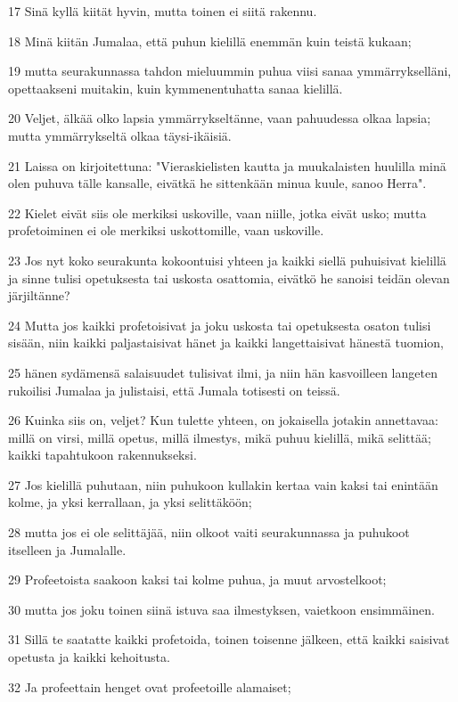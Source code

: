 \par 17 Sinä kyllä kiität hyvin, mutta toinen ei siitä rakennu.
\par 18 Minä kiitän Jumalaa, että puhun kielillä enemmän kuin teistä kukaan;
\par 19 mutta seurakunnassa tahdon mieluummin puhua viisi sanaa ymmärrykselläni, opettaakseni muitakin, kuin kymmenentuhatta sanaa kielillä.
\par 20 Veljet, älkää olko lapsia ymmärrykseltänne, vaan pahuudessa olkaa lapsia; mutta ymmärrykseltä olkaa täysi-ikäisiä.
\par 21 Laissa on kirjoitettuna: "Vieraskielisten kautta ja muukalaisten huulilla minä olen puhuva tälle kansalle, eivätkä he sittenkään minua kuule, sanoo Herra".
\par 22 Kielet eivät siis ole merkiksi uskoville, vaan niille, jotka eivät usko; mutta profetoiminen ei ole merkiksi uskottomille, vaan uskoville.
\par 23 Jos nyt koko seurakunta kokoontuisi yhteen ja kaikki siellä puhuisivat kielillä ja sinne tulisi opetuksesta tai uskosta osattomia, eivätkö he sanoisi teidän olevan järjiltänne?
\par 24 Mutta jos kaikki profetoisivat ja joku uskosta tai opetuksesta osaton tulisi sisään, niin kaikki paljastaisivat hänet ja kaikki langettaisivat hänestä tuomion,
\par 25 hänen sydämensä salaisuudet tulisivat ilmi, ja niin hän kasvoilleen langeten rukoilisi Jumalaa ja julistaisi, että Jumala totisesti on teissä.
\par 26 Kuinka siis on, veljet? Kun tulette yhteen, on jokaisella jotakin annettavaa: millä on virsi, millä opetus, millä ilmestys, mikä puhuu kielillä, mikä selittää; kaikki tapahtukoon rakennukseksi.
\par 27 Jos kielillä puhutaan, niin puhukoon kullakin kertaa vain kaksi tai enintään kolme, ja yksi kerrallaan, ja yksi selittäköön;
\par 28 mutta jos ei ole selittäjää, niin olkoot vaiti seurakunnassa ja puhukoot itselleen ja Jumalalle.
\par 29 Profeetoista saakoon kaksi tai kolme puhua, ja muut arvostelkoot;
\par 30 mutta jos joku toinen siinä istuva saa ilmestyksen, vaietkoon ensimmäinen.
\par 31 Sillä te saatatte kaikki profetoida, toinen toisenne jälkeen, että kaikki saisivat opetusta ja kaikki kehoitusta.
\par 32 Ja profeettain henget ovat profeetoille alamaiset;
